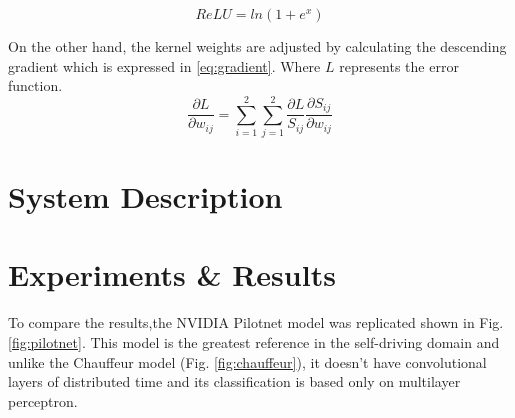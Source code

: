 \documentclass{cys}
\begin{document}
\begin{equation}
ReLU = ln(1+e^x)
\label{eq:relu}
\end{equation}

On the other hand, the kernel weights are adjusted by calculating the descending gradient which is expressed in \ref{eq:gradient}. Where $L$ represents the error function.
\begin{equation}
\frac{\partial L}{\partial w_{ij}} = \sum_{i=1}^{2} \sum_{j=1}^{2} \frac{\partial L}{S_{ij}} \frac{\partial S_{ij}}{\partial w_{ij}}
\label{eq:gradient}
\end{equation}



\section{System Description}
\label{sec:systemDescription}


\section{Experiments \& Results}
\label{sec:experiments}



To compare the results,the NVIDIA Pilotnet model \cite{bojarski2016end}\cite{bojarski2017explaining} was replicated  shown in Fig. \ref{fig:pilotnet}. This model is the greatest reference in the self-driving domain and unlike the Chauffeur model (Fig. \ref{fig:chauffeur}), it doesn't have convolutional layers of distributed time and its classification is based only on multilayer perceptron.
\end{document}
